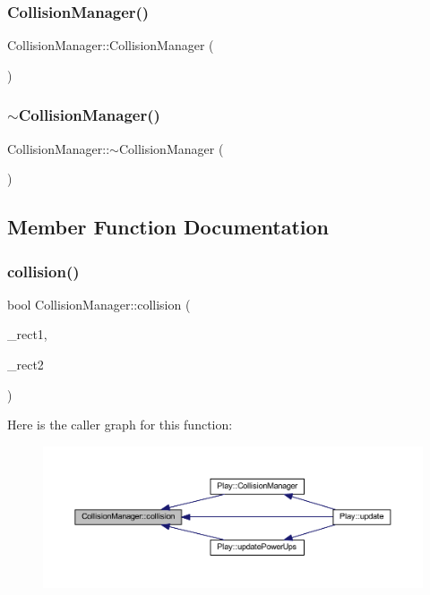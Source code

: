 \subsubsection{\texorpdfstring{Collision\+Manager()}{CollisionManager()}}
{\footnotesize\ttfamily Collision\+Manager\+::\+Collision\+Manager (\begin{DoxyParamCaption}{ }\end{DoxyParamCaption})}

\mbox{\label{class_collision_manager_acdbb3c842f0ef1c7a028d3f080855766}} 
\subsubsection{\texorpdfstring{$\sim$\+Collision\+Manager()}{~CollisionManager()}}
{\footnotesize\ttfamily Collision\+Manager\+::$\sim$\+Collision\+Manager (\begin{DoxyParamCaption}{ }\end{DoxyParamCaption})}



\subsection{Member Function Documentation}
\mbox{\label{class_collision_manager_affe670241642e07380fff0050d8ef459}} 
\subsubsection{\texorpdfstring{collision()}{collision()}}
{\footnotesize\ttfamily bool Collision\+Manager\+::collision (\begin{DoxyParamCaption}\item[{sf\+::\+Rectangle\+Shape}]{\+\_\+rect1,  }\item[{sf\+::\+Rectangle\+Shape}]{\+\_\+rect2 }\end{DoxyParamCaption})}

Here is the caller graph for this function\+:
\nopagebreak
\begin{figure}[H]
\begin{center}
\leavevmode
\includegraphics[width=350pt]{class_collision_manager_affe670241642e07380fff0050d8ef459_icgraph}
\end{center}
\end{figure}



